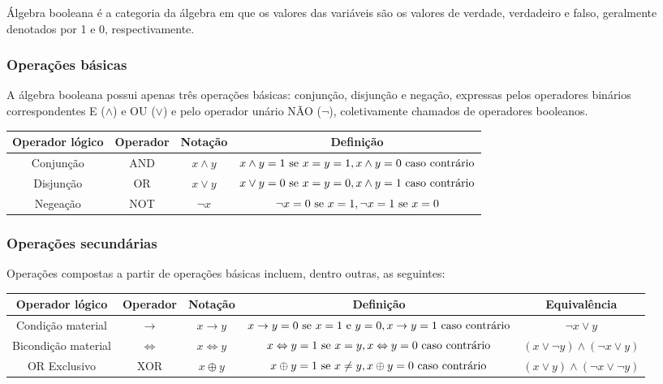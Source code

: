 Álgebra booleana é a categoria da álgebra em que os valores das variáveis são os valores de verdade, verdadeiro e falso, geralmente denotados por 1 e 0, respectivamente.

\subsubsection{Operações básicas}
A álgebra booleana possui apenas três operações básicas: conjunção, disjunção e negação, expressas pelos operadores binários correspondentes E ($\land$) e OU ($\lor$) e pelo operador unário NÃO ($\neg$), coletivamente chamados de operadores booleanos.

\begin{center}
    \begin{tabular}{c|c|c|c}
        Operador lógico & Operador & Notação & Definição\\
        \hline
        Conjunção & AND & $x \land y$  & $x \land y = 1 \textnormal{ se } x=y=1,x \land y = 0 \textnormal{ caso contrário}$ \\
        Disjunção & OR & $x \lor y$ & $x \lor y = 0 \textnormal{ se } x=y=0,x \land y = 1 \textnormal{ caso contrário}$  \\
        Negeação & NOT & $\neg x$ & $\neg x = 0 \textnormal{ se } x=1,\neg x  = 1 \textnormal{ se }x=0$ 
    \end{tabular}
    
\end{center}

\subsubsection{Operações secundárias}
Operações compostas a partir de operações básicas incluem, dentro outras, as seguintes:
\begin{center}
    \begin{tabular}{c|c|c|c|c}
        Operador lógico & Operador & Notação & Definição & Equivalência\\
        \hline
        Condição material & $\rightarrow$ & $x \rightarrow y$ & $x \rightarrow y = 0 \textnormal{ se } x = 1 \textnormal{ e } y = 0,x \rightarrow y = 1 \textnormal{ caso contrário}$ & $\neg x \lor y$ \\
        Bicondição material & $\Leftrightarrow$ & $x \Leftrightarrow y$ &$x \Leftrightarrow y = 1 \textnormal{ se } x=y,x \Leftrightarrow y = 0 \textnormal{ caso contrário}$ & $(x \lor \neg y) \land (\neg x \lor y)$\\
        OR Exclusivo & XOR & $x \oplus y$  &$x \oplus y = 1 \textnormal{ se } x\neq y,x \oplus y = 0 \textnormal{ caso contrário}$ & $(x \lor y) \land (\neg x \lor \neg y)$
    \end{tabular}
\end{center}

